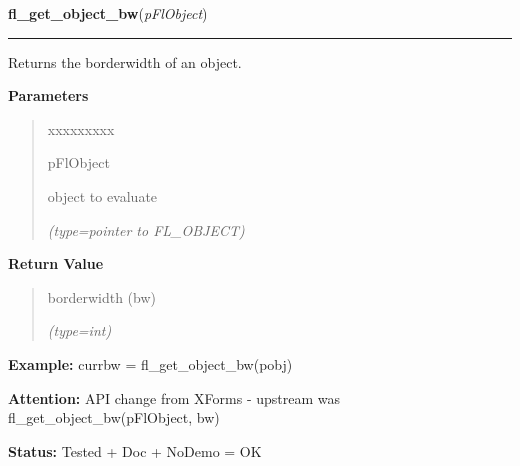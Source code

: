 \hspace{.8\funcindent}\begin{boxedminipage}{\funcwidth}

    \raggedright \textbf{fl\_get\_object\_bw}(\textit{pFlObject})

    \vspace{-1.5ex}

    \rule{\textwidth}{0.5\fboxrule}
\setlength{\parskip}{2ex}
    Returns the borderwidth of an object.

\setlength{\parskip}{1ex}
      \textbf{Parameters}
      \vspace{-1ex}

      \begin{quote}
        \begin{Ventry}{xxxxxxxxx}

          \item[pFlObject]

          object to evaluate

            {\it (type=pointer to FL\_OBJECT)}

        \end{Ventry}

      \end{quote}

      \textbf{Return Value}
    \vspace{-1ex}

      \begin{quote}
      borderwidth (bw)

      {\it (type=int)}

      \end{quote}

\textbf{Example:} currbw = fl\_get\_object\_bw(pobj)



\textbf{Attention:} API change from XForms - upstream was fl\_get\_object\_bw(pFlObject, bw)



\textbf{Status:} Tested + Doc + NoDemo = OK



    \end{boxedminipage}

    \label{xformslib:flbasic:fl_set_object_resize}

    \vspace{0.5ex}

